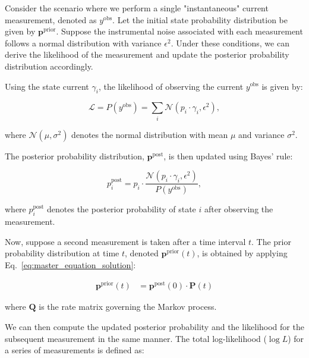 \documentclass[pdflatex,sn-mathphys-num]{sn-jnl}%
\theoremstyle{thmstyleone}%
\theoremstyle{thmstyletwo}%
\theoremstyle{thmstylethree}%
\begin{document}
Consider the scenario where we perform a single "instantaneous" current measurement, denoted as \( y^{\text{obs}} \). Let the initial state probability distribution be given by \( \boldsymbol{p}^{\text{prior}} \). Suppose the instrumental noise associated with each measurement follows a normal distribution with variance \( \epsilon^2 \). Under these conditions, we can derive the likelihood of the measurement and update the posterior probability distribution accordingly.

Using the state current $\gamma_i$, the likelihood of observing the current \( y^{\text{obs}} \) is given by:

\begin{equation}
	\mathcal{L} = P(y^{\text{obs}}) = \sum_i \mathcal{N}(p_i \cdot \gamma_i, \epsilon^2),
	\label{eq:single_channel_likelihood}
\end{equation}

where \( \mathcal{N}(\mu, \sigma^2) \) denotes the normal distribution with mean \( \mu \) and variance \( \sigma^2 \).

The posterior probability distribution, \( \boldsymbol{p}^{\text{post}} \), is then updated using Bayes' rule:

\begin{equation}
	p^{\text{post}}_i = p_i \cdot \frac{\mathcal{N}(p_i \cdot \gamma_i, \epsilon^2)}{P(y^{\text{obs}})},
	\label{eq:single_channel_posterior}
\end{equation}

where \( p^{\text{post}}_i \) denotes the posterior probability of state \( i \) after observing the measurement.

Now, suppose a second measurement is taken after a time interval \( t \). The prior probability distribution at time \( t \), denoted \( \boldsymbol{p}^{\text{prior}}(t) \), is obtained by applying Eq.~\ref{eq:master_equation_solution}:

\begin{align}
	\boldsymbol{p}^{\text{prior}}(t) &= \boldsymbol{p}^{\text{post}}(0) \cdot \boldsymbol{P}(t)
	\label{eq:prior_update}
\end{align}

where \( \boldsymbol{Q} \) is the rate matrix governing the Markov process.

We can then compute the updated posterior probability and the likelihood for the subsequent measurement in the same manner. The total log-likelihood (\( \log L \)) for a series of measurements is defined as:
\end{document}
